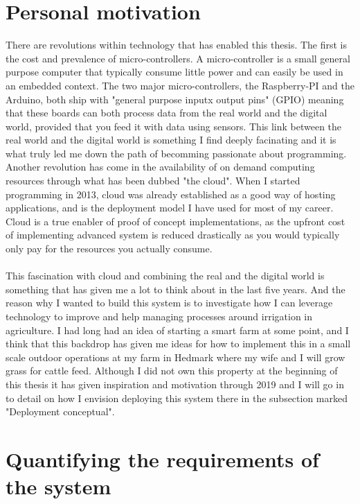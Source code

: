 \documentclass[]{uiophd}
\begin{document}
\section{Personal motivation}
There are revolutions within technology that has enabled this thesis. The first is the cost and prevalence of micro-controllers. A micro-controller is a small general purpose computer that typically consume little power and can easily be used in an embedded context. The two major micro-controllers, the Raspberry-PI and the Arduino, both ship with "general purpose inputx output pins" (GPIO) meaning that these boards can both process data from the real world and the digital world, provided that you feed it with data using sensors. This link between the real world and the digital world is something I find deeply facinating and it is what truly led me down the path of becomming passionate about programming. Another revolution has come in the availability of on demand computing resources through what has been dubbed "the cloud". When I started programming in 2013, cloud was already established as a good way of hosting applications, and is the deployment model I have used for most of my career. Cloud is a true enabler of proof of concept implementations, as the upfront cost of implementing advanced system is reduced drastically as you would typically only pay for the resources you actually consume.
\\\\
This fascination with cloud and combining the real and the digital world is something that has given me a lot to think about in the last five years. And the reason why I wanted to build this system is to investigate how I can leverage technology to improve and help managing processes around irrigation in agriculture. I had long had an idea of starting a smart farm at some point, and I think that this backdrop has given me ideas for how to implement this in a small scale outdoor operations at my farm in Hedmark where my wife and I will grow grass for cattle feed. Although I did not own this property at the beginning of this thesis it has given inspiration and motivation through 2019 and I will go in to detail on how I envision deploying this system there in the subsection marked "Deployment conceptual".

\section{Quantifying the requirements of the system}
\end{document}
